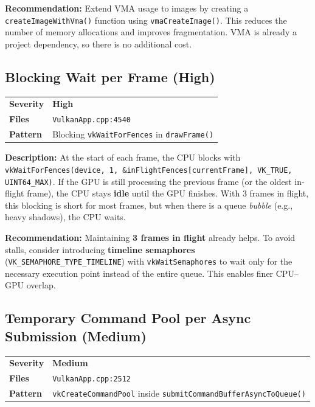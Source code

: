 \documentclass[a4paper,10pt]{article}
\newcommand{\severity}[1]{%
  \ifstrequal{#1}{Critical}{\textcolor{high}{\textbf{#1}}}{%
  \ifstrequal{#1}{High}{\textcolor{high}{\textbf{#1}}}{%
  \ifstrequal{#1}{Medium}{\textcolor{medium}{\textbf{#1}}}{%
  \ifstrequal{#1}{Low}{\textcolor{low}{\textbf{#1}}}{#1}}}}}
\begin{document}
\noindent\textbf{Recommendation:} Extend VMA usage to images by creating
a \texttt{createImageWithVma()} function using
\texttt{vmaCreateImage()}. This reduces the number of memory allocations and
improves fragmentation. VMA is already a project dependency, so there is no
additional cost.

\subsection{Blocking Wait per Frame (High)}

\begin{tabular}{ll}
    \textbf{Severity} & \severity{High} \\
    \textbf{Files}     & \texttt{VulkanApp.cpp:4540} \\
    \textbf{Pattern}   & Blocking \texttt{vkWaitForFences} in \texttt{drawFrame()} \\
\end{tabular}

\vspace{0.5em}
\noindent
\textbf{Description:} At the start of each frame, the CPU blocks with
\texttt{vkWaitForFences(device, 1, \&inFlightFences[currentFrame], VK\_TRUE,
UINT64\_MAX)}. If the GPU is still processing the previous frame (or the oldest
in-flight frame), the CPU stays \textbf{idle} until the GPU finishes. With 3
frames in flight, this blocking is short for most frames, but when there is a
queue \textit{bubble} (e.g., heavy shadows), the CPU waits.

\noindent\textbf{Recommendation:} Maintaining \textbf{3 frames in flight} already
helps. To avoid stalls, consider introducing \textbf{timeline semaphores}
(\texttt{VK\_SEMAPHORE\_TYPE\_TIMELINE}) with \texttt{vkWaitSemaphores} to
wait only for the necessary execution point instead of the entire queue. This
enables finer CPU--GPU overlap.

\subsection{Temporary Command Pool per Async Submission (Medium)}

\begin{tabular}{ll}
    \textbf{Severity} & \severity{Medium} \\
    \textbf{Files}     & \texttt{VulkanApp.cpp:2512} \\
    \textbf{Pattern}   & \texttt{vkCreateCommandPool} inside
                          \texttt{submitCommandBufferAsyncToQueue()} \\
\end{tabular}
\end{document}
